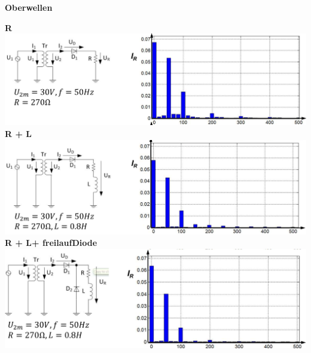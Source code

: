 %
\textbf{Oberwellen}\newline
\vspace{-1cm}
\begin{multicols}{3}
    \textbf{ \qquad R}\newline   
    \includegraphics[width=\linewidth]{images/M1UR}   
    \textbf{\null \qquad R + L}\newline
    \includegraphics[width=\linewidth]{images/M1URL}
    \textbf{ \qquad R + L+ freilaufDiode}\newline
    \includegraphics[width=\linewidth]{images/M1URLD}
\end{multicols}
